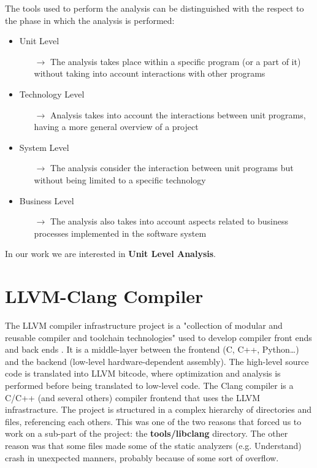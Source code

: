 The tools used to perform the analysis can be distinguished with the respect to the phase in which the analysis is performed:

\begin{itemize}
	\item Unit Level
	\begin{itemize}
		\item[$\rightarrow$] The analysis takes place within a specific program (or a part of it) without taking into account interactions with other programs
	\end{itemize}
	\item Technology Level
	\begin{itemize}
		\item[$\rightarrow$] Analysis takes into account the interactions between unit programs, having a more general overview of a project
	\end{itemize}
	\item System Level
	\begin{itemize}
		\item[$\rightarrow$] The analysis consider the interaction between unit programs but without being limited to a specific technology
	\end{itemize}
	\item Business Level
	\begin{itemize}
		\item[$\rightarrow$] The analysis also takes into account aspects related to business processes implemented in the software system
	\end{itemize}
\end{itemize}

In our work we are interested in \textbf{Unit Level Analysis}.
\pagebreak

\section{LLVM-Clang Compiler}

The LLVM compiler infrastructure project is a "collection of modular and reusable compiler and toolchain technologies" used to develop compiler front ends and back ends \cite{bibitem1}. It is a middle-layer between the frontend (C, C++, Python\dots) and the backend (low-level hardware-dependent assembly). The high-level source code is translated into LLVM bitcode, where optimization and analysis is performed before being translated to low-level code.\newline
The Clang compiler is a C/C++ (and several others) compiler frontend that uses the LLVM infrastracture.\newline
The project is structured in a complex hierarchy of directories and files, referencing each others. This was one of the two reasons that forced us to work on a sub-part of the project: the \textbf{tools/libclang} directory. The other reason was that some files made some of the static analyzers (e.g. Understand) crash in unexpected manners, probably because of some sort of overflow.\newline

